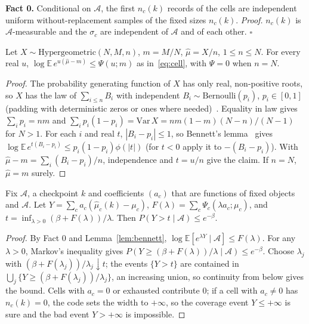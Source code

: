 \documentclass[sigconf,anonymous,review]{acmart}
\newcommand{\cA}{\mathcal{A}}
\begin{document}
\textbf{Fact 0.} Conditional on $\cA$, the first $n_c(k)$ records of the cells are independent uniform without-replacement samples of the fixed sizes $n_c(k)$. \emph{Proof.} $n_c(k)$ is $\cA$-measurable and the $\sigma_c$ are independent of $\cA$ and of each other. $\square$

\begin{lemma}\label{lem:bennett}
Let $X \sim \mathrm{Hypergeometric}(N, M, n)$, $m = M/N$, $\hat\mu = X/n$, $1 \le n \le N$. For every real $u$, $\log \mathbb{E}\, e^{u(\hat\mu - m)} \le \Psi(u; m)$ as in~\eqref{eq:cell}, with $\Psi = 0$ when $n = N$.
\end{lemma}
\begin{proof}
The probability generating function of $X$ has only real, non-positive roots, so $X$ has the law of $\sum_{i \le n} B_i$ with independent $B_i \sim \mathrm{Bernoulli}(p_i)$, $p_i \in [0,1]$ (padding with deterministic zeros or ones where needed)~\citep{vatutin1982limit,tang2023poisson}. Equality in law gives $\sum_i p_i = nm$ and $\sum_i p_i(1-p_i) = \mathrm{Var}\,X = n m(1-m)(N-n)/(N-1)$ for $N > 1$. For each $i$ and real $t$, $|B_i - p_i| \le 1$, so Bennett's lemma~\citep{bennett1962probability} gives $\log \mathbb{E}\, e^{t(B_i - p_i)} \le p_i(1-p_i)\phi(|t|)$ (for $t < 0$ apply it to $-(B_i - p_i)$). With $\hat\mu - m = \sum_i (B_i - p_i)/n$, independence and $t = u/n$ give the claim. If $n = N$, $\hat\mu = m$ surely.
\end{proof}

\begin{lemma}\label{lem:chernoff}
Fix $\cA$, a checkpoint $k$ and coefficients $(a_c)$ that are functions of fixed objects and $\cA$. Let $Y = \sum_c a_c(\hat\mu_c(k) - \mu_c)$, $F(\lambda) = \sum_c \Psi_c(\lambda a_c; \mu_c)$, and $t = \inf_{\lambda > 0}(\beta + F(\lambda))/\lambda$. Then $P(Y > t \mid \cA) \le e^{-\beta}$.
\end{lemma}
\begin{proof}
By Fact 0 and Lemma~\ref{lem:bennett}, $\log \mathbb{E}[e^{\lambda Y} \mid \cA] \le F(\lambda)$. For any $\lambda > 0$, Markov's inequality gives $P(Y \ge (\beta + F(\lambda))/\lambda \mid \cA) \le e^{-\beta}$. Choose $\lambda_j$ with $(\beta + F(\lambda_j))/\lambda_j \downarrow t$; the events $\{Y > t\}$ are contained in $\bigcup_j \{Y \ge (\beta+F(\lambda_j))/\lambda_j\}$, an increasing union, so continuity from below gives the bound. Cells with $a_c = 0$ or exhausted contribute 0; if a cell with $a_c \neq 0$ has $n_c(k) = 0$, the code sets the width to $+\infty$, so the coverage event $Y \le +\infty$ is sure and the bad event $Y > +\infty$ is impossible.
\end{proof}
\end{document}
